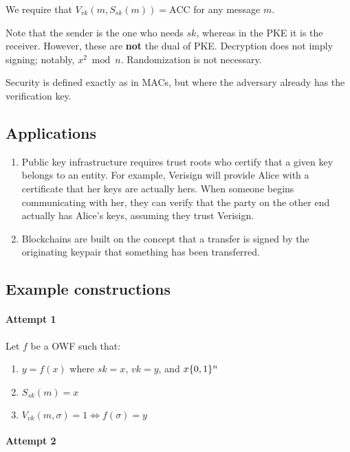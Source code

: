 \documentclass{idc_msc}
\let\getsrandom\relax
\newcommand{\getsrandom}{\ensuremath{\overset{R}{\gets}}}
\begin{document}
We require that \(V_{vk}(m, S_{sk}(m)) = \mathrm{ACC}\) for any message \(m\).

Note that the sender is the one who needs \(sk\), whereas in the PKE it is the receiver.
However, these are \textbf{not} the dual of PKE.
Decryption does not imply signing; notably, \(x^2 \bmod n\).
Randomization is not necessary.

Security is defined exactly as in MACs, but where the adversary already has the verification key.

\subsection{Applications}

\begin{enumerate}
  \item Public key infrastructure requires trust roots who certify that a given key belongs to an entity.
  For example, Verisign will provide Alice with a certificate that her keys are actually hers.
  When someone begins communicating with her, they can verify that the party on the other end actually has Alice's keys, assuming they trust Verisign.
  \item Blockchains are built on the concept that a transfer is signed by the originating keypair that something has been transferred.
\end{enumerate}

\subsection{Example constructions}

\paragraph{Attempt 1}

Let \(f\) be a OWF such that:

\begin{enumerate}
  \item \(y=f(x)\) where \(sk = x\), \(vk = y\), and \(x \getsrandom \{0,1\}^n\)
  \item \(S_{sk}(m) = x\)
  \item \(V_{vk}(m,\sigma) = 1 \Leftrightarrow f(\sigma) = y\)
\end{enumerate}

\paragraph{Attempt 2}
\end{document}
